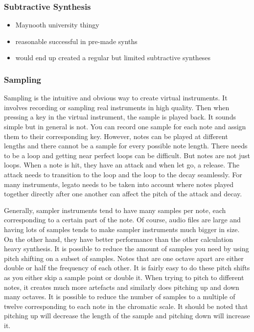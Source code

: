 \documentclass[12pt]{article}
\begin{document}
	\subsubsection{Subtractive Synthesis}
	\begin{itemize}
		\item Maynooth university thingy
		\item reasonable successful in pre-made synths
		\item would end up created a regular but limited subtractive syntheses
	\end{itemize}
	
	
	
	\subsubsection{Sampling}
	Sampling is the intuitive and obvious way to create virtual instruments. It involves recording or sampling real instruments in high quality. Then when
	pressing a key in the virtual instrument, the sample is played back. It sounds simple but in general is not. You can record one sample for each note and assign them
	to their corresponding key. However, notes can be played at different lengths and there cannot be a sample for every possible note length. There needs to be a loop and 
	getting near perfect loops can be difficult. But notes are not just loops. When a note is hit, they have an attack and when let go, a release. The attack needs to transition
	to the loop and the loop to the decay seamlessly. For many instruments, legato needs to be taken into account where notes played together directly after one another
	can affect the pitch of the attack and decay.
	
	Generally, sampler instruments tend to have many samples per note, each corresponding to a certain part of the note. Of course, audio files are large and having lots of samples
	tends to make sampler instruments much bigger in size. On the other hand, they have better performance than the other calculation heavy synthesis. It is possible to reduce
	the amount of samples you need by using pitch shifting on a subset of samples. Notes that are one octave apart are either double or half the frequency of each other. It is 
	fairly easy to do these pitch shifts as you either skip a sample point or double it. When trying to pitch to different notes, it creates much more artefacts and similarly 
	does pitching up and down many octaves. It is possible to reduce the number of samples to a multiple of twelve corresponding to each note in the chromatic scale. 
	It should be noted that pitching up will decrease the length of the sample and pitching down will increase it.
	
\end{document}
